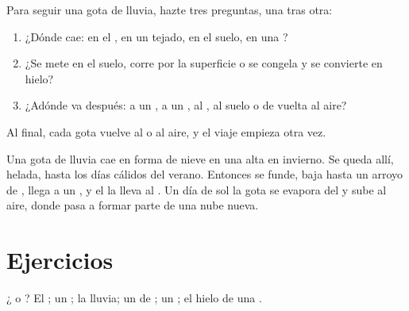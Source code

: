 \begin{method}\label{met:g2:water-on-earth:drop}
Para seguir una gota de lluvia, hazte tres preguntas, una tras otra:
\begin{enumerate}
  \item ¿Dónde cae: en el , en un tejado, en el suelo, en una ?
  \item ¿Se mete en el suelo, corre por la superficie o se congela y se
        convierte en hielo?
  \item ¿Adónde va después: a un , a un , al , al suelo o de
        vuelta al aire?
\end{enumerate}
Al final, cada gota vuelve al  o al aire, y el viaje empieza otra vez.
\end{method}

\begin{example}\label{ex:g2:water-on-earth:mountain}
Una gota de lluvia cae en forma de nieve en una alta  en invierno.
Se queda allí, helada, hasta los días cálidos del verano. Entonces se
funde, baja hasta un arroyo de , llega a un , y el  la lleva
al . Un día de sol la gota se evapora del  y sube al aire, donde pasa
a formar parte de una nube nueva.
\end{example}

\section{Ejercicios}

\begin{exercise}[$\star$]\label{exo:g2:water-on-earth:1}
¿ o ? El ; un ; la lluvia; un  de ;
un ; el hielo de una .
\end{exercise}

